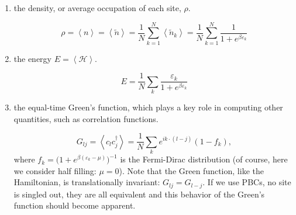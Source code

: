 \begin{enumerate}
\item the density, or average occupation of each site, $\rho$.

\begin{equation}
\rho = \left\langle n \right\rangle = \left\langle \tilde{n} \right\rangle = \frac{1}{N} \sum_{k=1}^N \left\langle \tilde{n}_k \right\rangle  = \frac{1}{N} \sum_{k=1}^N  \frac{1}{1 + e^{\beta\varepsilon_k}}
\end{equation}

\item the energy $E = \left\langle \mathcal{H} \right\rangle$.

\begin{equation}
E = \frac{1}{N} \sum_k \frac{\varepsilon_k}{1 + e^{\beta\varepsilon_k}}
\end{equation}

\item the equal-time Green's function, which plays a key role in computing other quantities, such as correlation functions.

\begin{equation}
G_{lj} = \left\langle c_l c_j^\dagger \right\rangle = \frac{1}{N} \sum_k e^{ i k \cdot ( l - j ) } ( 1 - f_k ),
\end{equation}
where $f_k = \big(1 + e^{\beta(\varepsilon_k - \mu)} \big)^{-1}$ is the Fermi-Dirac distribution (of course, here we consider half filling: $\mu = 0$). Note that the Green function, like the Hamiltonian, is translationally invariant: $G_{lj} = G_{l-j}$. If we use PBCs, no site is singled out, they are all equivalent and this behavior of the Green's function should become apparent.
\end{enumerate}
